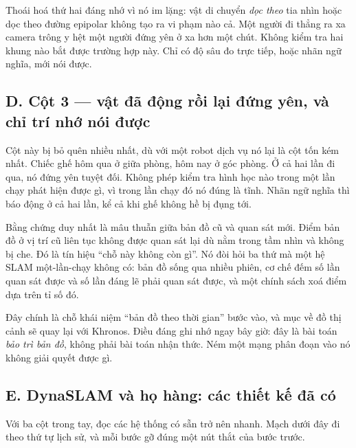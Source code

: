 \documentclass[../../deep_learning.tex]{subfiles}
\begin{document}
Thoái hoá thứ hai đáng nhớ vì nó im lặng: vật di chuyển \emph{dọc theo} tia nhìn hoặc dọc theo đường epipolar không tạo ra vi phạm nào cả. Một người đi thẳng ra xa camera trông y hệt một người đứng yên ở xa hơn một chút. Không kiểm tra hai khung nào bắt được trường hợp này. Chỉ có độ sâu đo trực tiếp, hoặc nhãn ngữ nghĩa, mới nói được.

\subsection{D. Cột 3 --- vật đã động rồi lại đứng yên, và chỉ trí nhớ nói được}
Cột này bị bỏ quên nhiều nhất, dù với một robot dịch vụ nó lại là cột tốn kém nhất. Chiếc ghế hôm qua ở giữa phòng, hôm nay ở góc phòng. Ở cả hai lần đi qua, nó đứng yên tuyệt đối. Không phép kiểm tra hình học nào trong một lần chạy phát hiện được gì, vì trong lần chạy đó nó đúng là tĩnh. Nhãn ngữ nghĩa thì báo động ở cả hai lần, kể cả khi ghế không hề bị đụng tới.

Bằng chứng duy nhất là mâu thuẫn giữa bản đồ cũ và quan sát mới. Điểm bản đồ ở vị trí cũ liên tục không được quan sát lại dù nằm trong tầm nhìn và không bị che. Đó là tín hiệu ``chỗ này không còn gì''. Nó đòi hỏi ba thứ mà một hệ SLAM một-lần-chạy không có: bản đồ sống qua nhiều phiên, cơ chế đếm số lần quan sát được và số lần đáng lẽ phải quan sát được, và một chính sách xoá điểm dựa trên tỉ số đó.

Đây chính là chỗ khái niệm ``bản đồ theo thời gian'' bước vào, và mục về đồ thị cảnh sẽ quay lại với Khronos. Điều đáng ghi nhớ ngay bây giờ: đây là bài toán \emph{bảo trì bản đồ}, không phải bài toán nhận thức. Ném một mạng phân đoạn vào nó không giải quyết được gì.

\subsection{E. DynaSLAM và họ hàng: các thiết kế đã có}
Với ba cột trong tay, đọc các hệ thống có sẵn trở nên nhanh. Mạch dưới đây đi theo thứ tự lịch sử, và mỗi bước gỡ đúng một nút thắt của bước trước.
\end{document}
